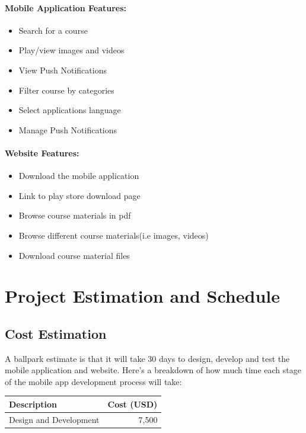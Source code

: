 \documentclass[12pt]{extarticle}
\begin{document}
\paragraph{Mobile Application Features:}
\begin{itemize}
	\item Search for a course
	\item Play/view images and videos
	\item View Push Notifications
	\item Filter course by categories
	\item Select applications language
	\item Manage Push Notifications
	
\end{itemize}

\paragraph{Website Features:}
\begin{itemize}
	\item Download the mobile application
	\item Link to play store download page
	\item Browse course materials in pdf
	\item Browse different course materials(i.e images, videos)
	\item Download course material files
\end{itemize}


\section{Project Estimation and Schedule}
\subsection{Cost Estimation}
A ballpark estimate is that it will take 30 days to design,
develop and test the mobile application and website. Here's a breakdown
of how much time each stage of the mobile app development
process will take:
\begin{center}
  \begin{tabular}{ | l | r | }
    \hline
    \textbf{Description} & \textbf{Cost (USD)} \\ 
    \hline
    Design and Development &  7,500 \\ \hline
  \end{tabular}
\end{center}
\end{document}
